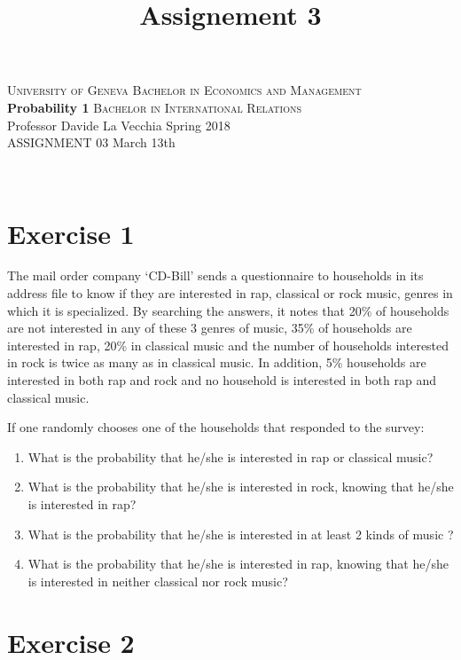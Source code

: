 \documentclass[12pt,thmsa]{article}
\title{Assignement 3}
\begin{document}
\noindent \textsc{University of Geneva}     \hfill \textsc{Bachelor in Economics and Management} \\
\textbf{Probability 1}                      \hfill \textsc{Bachelor in International Relations} \\
Professor Davide La Vecchia                 \hfill Spring 2018  \\
ASSIGNMENT 03                               \hfill   March 13th



\noindent
\makebox[\linewidth]{\rule{\textwidth}{0.4pt}}\\[1.5ex]

\section*{Exercise 1}


The mail order company `CD-Bill' sends a questionnaire to households
in its address file to know if they are interested in rap,
classical or rock  music, genres in which it is specialized. By searching the answers, it
notes that 20\% of households are not interested in any of these 3 genres of music, 35\% of households are interested in rap, 20\% in classical music and the number of households interested in rock is twice as many as in classical music. In addition, 5\%
households are interested in both rap and rock and no household is interested
in both rap and classical music.

\medskip

\noindent If one randomly chooses one of the households that responded to the
  survey:

 \begin{enumerate}%
 \item What is the probability that he/she is interested in rap or
classical music?


 \item What is the probability that he/she is interested in rock, knowing
that he/she is interested in rap?


 \item What is the probability that he/she is interested in at least 2 kinds of
music ?

 \item What is the probability that he/she is interested in rap, knowing that he/she is interested in neither classical nor rock music?
 \end{enumerate}


\section*{Exercise 2}
\end{document}

